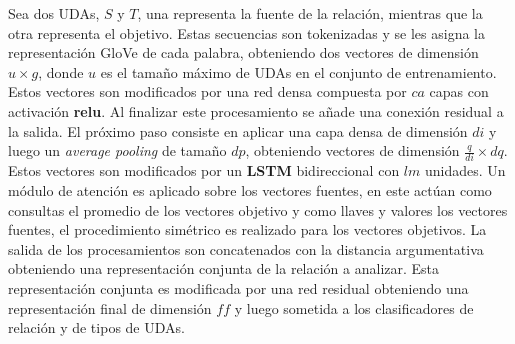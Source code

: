 Sea dos UDAs, $S$ y $T$, una representa la fuente de la relación, mientras que la otra representa
el objetivo. Estas secuencias son tokenizadas y se les asigna la representación GloVe de cada palabra, obteniendo
dos vectores de dimensión $u \times g$, donde $u$ es el tamaño máximo de UDAs en el conjunto de entrenamiento.
Estos vectores son modificados por una red densa compuesta por $ca$ capas con activación \textbf{relu}. 
Al finalizar este procesamiento se añade una conexión residual
a la salida. El próximo paso consiste en aplicar una capa densa de dimensión $di$ y luego un \emph{average pooling}
de tamaño $dp$, obteniendo vectores de dimensión $\frac{q}{di} \times dq$. 
Estos vectores son modificados por un \textbf{LSTM} bidireccional con $lm$ unidades. Un módulo de atención es aplicado 
sobre los vectores fuentes, 
en este actúan como consultas el promedio de los vectores objetivo y como llaves y valores los vectores fuentes,
el procedimiento simétrico es realizado para los vectores objetivos.
La salida de los procesamientos son concatenados con la distancia argumentativa obteniendo una representación 
conjunta de la relación a analizar. Esta representación conjunta es modificada por una red residual obteniendo
una representación final de dimensión $ff$ y luego sometida a los clasificadores de relación y de tipos de UDAs.

